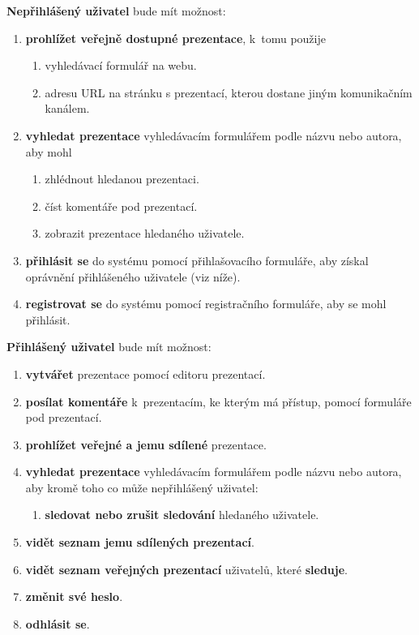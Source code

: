 \documentclass[11pt,twoside,a4paper]{book}
\begin{document}
\noindent \textbf{Nepřihlášený uživatel} bude mít možnost:
\begin{enumerate}
	\item \textbf{prohlížet veřejně dostupné prezentace}, k~tomu použije 
		\begin{enumerate}[label*=\arabic*.]
			\item vyhledávací formulář na webu.
			\item adresu URL na stránku s prezentací, kterou dostane jiným komunikačním kanálem.
		\end{enumerate}
	\item \textbf{vyhledat prezentace} vyhledávacím formulářem podle názvu nebo autora, aby mohl
		\begin{enumerate}[label*=\arabic*.]
			\item zhlédnout hledanou prezentaci.
			\item číst komentáře pod prezentací.
			\item zobrazit prezentace hledaného uživatele.
		\end{enumerate}
	\item \textbf{přihlásit se} do systému pomocí přihlašovacího formuláře, aby získal oprávnění přihlášeného uživatele (viz níže).
	\item \textbf{registrovat se} do systému pomocí registračního formuláře, aby se mohl přihlásit.
\end{enumerate}


\noindent \textbf{Přihlášený uživatel} bude mít možnost:
\begin{enumerate}
	\item \textbf{vytvářet} prezentace pomocí editoru prezentací.
	\item \textbf{posílat komentáře} k~prezentacím, ke kterým má přístup, pomocí formuláře pod prezentací.
	\item \textbf{prohlížet veřejné a jemu sdílené} prezentace.
	\item \textbf{vyhledat prezentace} vyhledávacím formulářem podle názvu nebo autora, aby kromě toho co může nepřihlášený uživatel:
		\begin{enumerate}[label*=\arabic*.]
		\item \textbf{sledovat nebo zrušit sledování} hledaného uživatele.
		\end{enumerate}
	\item \textbf{vidět seznam jemu sdílených prezentací}.
	\item \textbf{vidět seznam veřejných prezentací} uživatelů, které \textbf{sleduje}.
	\item \textbf{změnit své heslo}.
	\item \textbf{odhlásit se}.
\end{enumerate}
\end{document}
